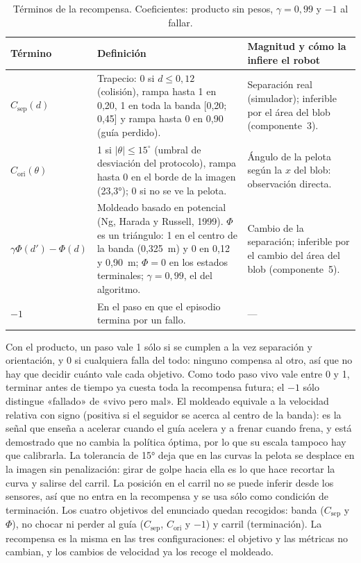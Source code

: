 \documentclass[11pt,a4paper]{article}
\begin{document}
\begin{table}[h]
\centering\small
\caption{Términos de la recompensa. Coeficientes: producto sin pesos, $\gamma=0{,}99$ y $-1$ al fallar.}
\label{tab:recompensa}
\begin{tabularx}{\linewidth}{@{}lYY@{}}
\toprule
Término & Definición & Magnitud y cómo la infiere el robot \\
\midrule
$C_{\text{sep}}(d)$ & Trapecio: 0 si $d\le0{,}12$ (colisión), rampa hasta 1 en 0,20, 1 en toda la banda
[0,20; 0,45] y rampa hasta 0 en 0,90 (guía perdido). &
Separación real (simulador); inferible por el área del blob (componente~3). \\
$C_{\text{ori}}(\theta)$ & 1 si $|\theta|\le15^{\circ}$ (umbral de desviación del protocolo), rampa hasta 0 en el borde
de la imagen (23,3°); 0 si no se ve la pelota. & Ángulo de la pelota según la $x$ del blob: observación
directa. \\
$\gamma\Phi(d')-\Phi(d)$ & Moldeado basado en potencial (Ng, Harada y Russell, 1999). $\Phi$ es un triángulo: 1
en el centro de la banda (0,325~m) y 0 en 0,12 y 0,90~m; $\Phi=0$ en los estados terminales; $\gamma=0{,}99$,
el del algoritmo. & Cambio de la separación; inferible por el cambio del área del blob (componente~5). \\
$-1$ & En el paso en que el episodio termina por un fallo. & --- \\
\bottomrule
\end{tabularx}
\end{table}

Con el producto, un paso vale 1 sólo si se cumplen a la vez separación y orientación, y 0 si cualquiera falla
del todo: ninguno compensa al otro, así que no hay que decidir cuánto vale cada objetivo. Como todo paso vivo vale
entre 0 y 1, terminar antes de tiempo ya cuesta toda la recompensa futura; el $-1$ sólo distingue «fallado» de
«vivo pero mal». El moldeado equivale a la velocidad relativa con signo (positiva si el seguidor se acerca al
centro de la banda): es la señal que enseña a acelerar cuando el guía acelera y a frenar cuando frena, y está
demostrado que no cambia la política óptima, por lo que su escala tampoco hay que calibrarla. La tolerancia de
15° deja que en las curvas la pelota se desplace en la imagen sin penalización: girar de golpe hacia ella es lo
que hace recortar la curva y salirse del carril. La posición en el carril no se puede inferir desde los
sensores, así que no entra en la recompensa y se usa sólo como condición de terminación. Los cuatro objetivos
del enunciado quedan recogidos: banda ($C_{\text{sep}}$ y $\Phi$), no chocar ni perder al guía ($C_{\text{sep}}$,
$C_{\text{ori}}$ y $-1$) y carril (terminación). La recompensa es la misma en las tres configuraciones: el
objetivo y las métricas no cambian, y los cambios de velocidad ya los recoge el moldeado.
\end{document}
